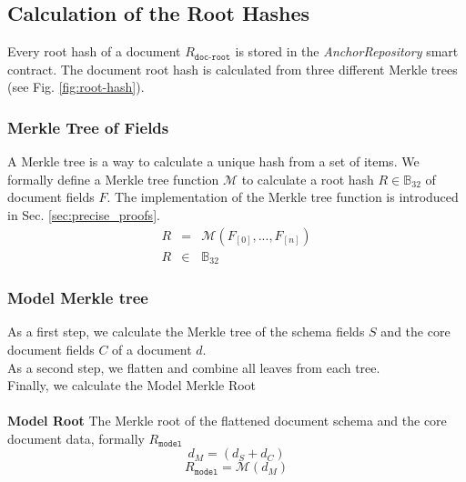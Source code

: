\subsection{Calculation of the Root Hashes}
Every root hash of a document $R_{\texttt{doc-root}}$ is stored in the
\textit{AnchorRepository} smart contract. The document root hash is calculated from three different Merkle trees (see Fig. \ref{fig:root-hash}). 
\subsubsection{Merkle Tree of Fields}
A Merkle tree is a way to calculate a unique hash from a set of items. We formally define a Merkle tree function $\mathcal{M}$ to calculate a root hash $R \in \mathbb{B}_{32}$ of document fields $F$. The implementation of the Merkle tree function is introduced in Sec. \ref{sec:precise_proofs}.
 \begin{eqnarray}
 R & = &\mathcal{M}(F_{[0]},...,F_{[n]}) \\
 R & \in & \mathbb{B}_{32}
\end{eqnarray}
\newline
\subsubsection{Model Merkle tree}
As a first step, we calculate the Merkle tree of the schema fields $S$ and the core document fields $C$ of a document $d$.\\
As a second step, we flatten and combine all leaves from each tree.\\ 
Finally, we calculate the Model Merkle Root\\\\
\textbf{Model Root} The Merkle root of the flattened document schema and the core document data, formally $R_{{\texttt{model}}}$ 
\newline
\begin{equation}
    d_M = (d_S + d_C)
\end{equation}
\begin{equation}
    R_{{\texttt{model}}} = \mathcal{M}(d_M)
\end{equation}
\newline
